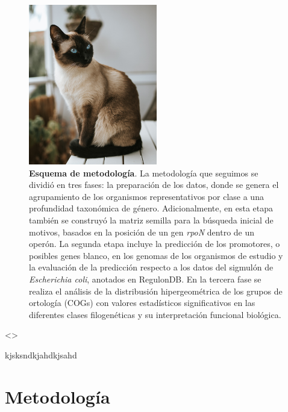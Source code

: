 \documentclass[
  12pt,
  letterpaper,
  DIV=11,
  numbers=noendperiod,
  oneside]{scrreport}
\begin{document}
\begin{figure}[H]

{\centering \includegraphics[width=0.5\textwidth,height=\textheight]{./imagenes/gato_siames.jpg}

}

\caption{\label{fig-metodologia}\textbf{Esquema de metodología}. La
metodología que seguimos se dividió en tres fases: la preparación de los
datos, donde se genera el agrupamiento de los organismos representativos
por clase a una profundidad taxonómica de género. Adicionalmente, en
esta etapa también se construyó la matriz semilla para la búsqueda
inicial de motivos, basados en la posición de un gen \emph{rpoN} dentro
de un operón. La segunda etapa incluye la predicción de los promotores,
o posibles genes blanco, en los genomas de los organismos de estudio y
la evaluación de la predicción respecto a los datos del sigmulón de
\emph{Escherichia coli}, anotados en RegulonDB. En la tercera fase se
realiza el análisis de la distribusión hipergeométrica de los grupos de
ortología (COGs) con valores estadísticos significativos en las
diferentes clases filogenéticas y su interpretación funcional
biológica.}

\end{figure}

\textless{}\break\textgreater{}

kjsksndkjahdkjsahd


\hypertarget{sec-metodologia}{%
\chapter{Metodología}\label{sec-metodologia}}
\end{document}
